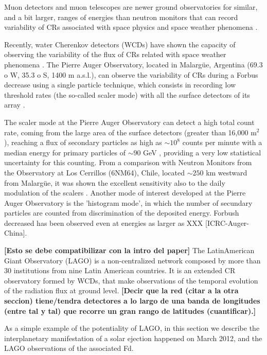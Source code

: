 Muon detectors and muon telescopes are newer ground observatories for similar, and a bit larger, ranges of energies than neutron monitors
that can record variability of CRs associated with space physics and space weather phenomena \cite[e.g., ][]{Munakata12}.

Recently, water Cherenkov detectors (WCDs) have shown the capacity of observing the variability
of the flux of CRs related with space weather phenomena \cite{FALAugerscalers11, AugerCOLAGE12, ICRC-Auger, ICRC-LAGO}.
The Pierre Auger Observatory, located in Malarg\"ue, Argentina (69.3 o W, 35.3 o S, 1400 m a.s.l.), can observe the variability
of CRs during a Forbus decrease using a single particle technique,
which consists in recording low threshold rates (the so-called scaler mode)
with all the surface detectors of its array \cite{FALAugerscalers11}.

The scaler mode at the Pierre Auger Observatory can detect a high total count rate, coming from the large area of the surface detectors
(greater than 16,000 m$^2$), reaching a flux of secondary particles as high as $\sim 10^8$ counts per minute
with a median energy for primary particles of $\sim 90$ GeV \cite{AugerCOLAGE12}, providing a very low statistical uncertainty for this counting.
From a comparison with Neutron Monitors from the Observatory at Los Cerrillos (6NM64), Chile, located
$\sim 250$ km westward from Malarg\"ue, it was shown the excellent sensitivity also to the daily modulation of the scalers \cite{AugerCOLAGE12}.
Another mode of interest developed at the Pierre Auger Observatory is the 'histogram mode', in which
the number of secundary particles are counted from discrimination of the deposited energy.
Forbush decreased has been observed even at energies as larger as XXX [ICRC-Auger-China].

{\bf [Esto se debe compatibilizar con la intro del paper]}
The LatinAmerican Giant Observatory (LAGO) is a non-centralized network composed by more than 30 institutions from nine Latin American countries.
It is an extended CR observatory formed by WCDs, that make observations of the temporal evolution of the radiation flux at ground level.
{\bf [Decir que la red (citar a la otra seccion) tiene/tendra detectores a lo largo de una banda de longitudes (entre tal y tal)
que recorre un gran rango de latitudes (cuantificar).]}

As a simple example of the potentiality of LAGO, in this section we describe
the interplanetary manifestation of a solar ejection happened on March 2012,
and the LAGO observations of the associated Fd.

